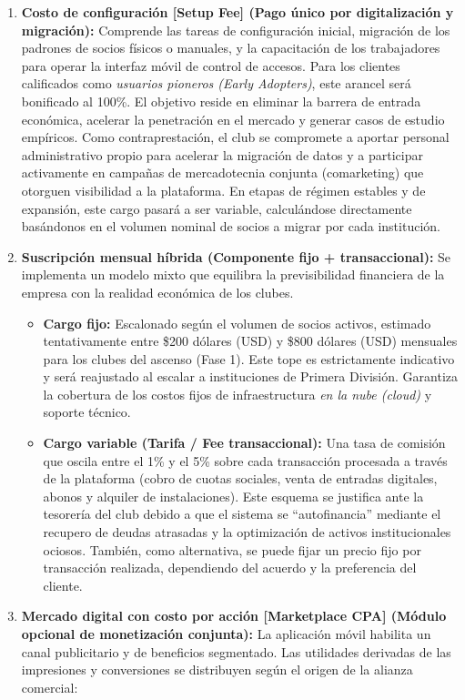 \begin{enumerate}
    \item \textbf{Costo de configuración [Setup Fee] (Pago único por digitalización y migración):} Comprende las tareas de configuración inicial, migración de los padrones de socios físicos o manuales, y la capacitación de los trabajadores para operar la interfaz móvil de control de accesos. Para los clientes calificados como \textit{usuarios pioneros (Early Adopters)}, este arancel será bonificado al 100\%. El objetivo reside en eliminar la barrera de entrada económica, acelerar la penetración en el mercado y generar casos de estudio empíricos. Como contraprestación, el club se compromete a aportar personal administrativo propio para acelerar la migración de datos y a participar activamente en campañas de mercadotecnia conjunta (comarketing) que otorguen visibilidad a la plataforma. En etapas de régimen estables y de expansión, este cargo pasará a ser variable, calculándose directamente basándonos en el volumen nominal de socios a migrar por cada institución.
    \item \textbf{Suscripción mensual híbrida (Componente fijo + transaccional):} Se implementa un modelo mixto que equilibra la previsibilidad financiera de la empresa con la realidad económica de los clubes.
    \begin{itemize}
        \item \textbf{Cargo fijo:} Escalonado según el volumen de socios activos, estimado tentativamente entre \$200 dólares (USD) y \$800 dólares (USD) mensuales para los clubes del ascenso (Fase 1). Este tope es estrictamente indicativo y será reajustado al escalar a instituciones de Primera División. Garantiza la cobertura de los costos fijos de infraestructura \textit{en la nube (cloud)} y soporte técnico.
        \item \textbf{Cargo variable (Tarifa / Fee transaccional):} Una tasa de comisión que oscila entre el 1\% y el 5\% sobre cada transacción procesada a través de la plataforma (cobro de cuotas sociales, venta de entradas digitales, abonos y alquiler de instalaciones). Este esquema se justifica ante la tesorería del club debido a que el sistema se ``autofinancia'' mediante el recupero de deudas atrasadas y la optimización de activos institucionales ociosos. También, como alternativa, se puede fijar un precio fijo por transacción realizada, dependiendo del acuerdo y la preferencia del cliente.
    \end{itemize}
    \newpage
    \item \textbf{Mercado digital con costo por acción [Marketplace CPA] (Módulo opcional de monetización conjunta):} La aplicación móvil habilita un canal publicitario y de beneficios segmentado. Las utilidades derivadas de las impresiones y conversiones se distribuyen según el origen de la alianza comercial:

\end{enumerate}
